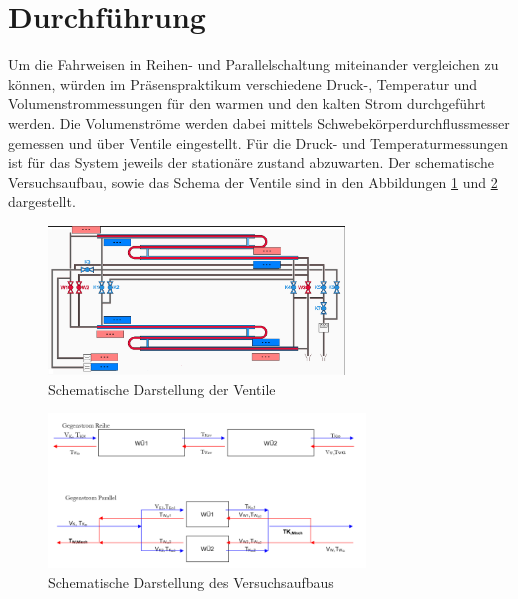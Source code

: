 
\section{Durchführung}
\label{sec:durchfuerung}

Um die Fahrweisen in Reihen- und Parallelschaltung miteinander vergleichen zu können, würden im Präsenspraktikum verschiedene Druck-, Temperatur und Volumenstrommessungen für den warmen und den kalten Strom durchgeführt werden. Die Volumenströme werden dabei mittels Schwebekörperdurchflussmesser gemessen und über Ventile eingestellt.  Für die Druck- und Temperaturmessungen ist für das System jeweils der stationäre zustand abzuwarten.
Der schematische Versuchsaufbau, sowie das Schema der Ventile sind in den Abbildungen \ref{fig:schema} und \ref{fig:schema1} dargestellt.
\vspace{2mm}

\begin{figure}[h!]
	\centering
	\includegraphics[width=0.7\textwidth]{img/schema}
	\caption{Schematische Darstellung der Ventile}
	\label{fig:schema}
\end{figure}
\FloatBarrier
\begin{figure}[h!]
	\centering
	\includegraphics[width=0.75\textwidth]{img/schema1}
	\caption{Schematische Darstellung des Versuchsaufbaus}
	\label{fig:schema1}
\end{figure}
\FloatBarrier
